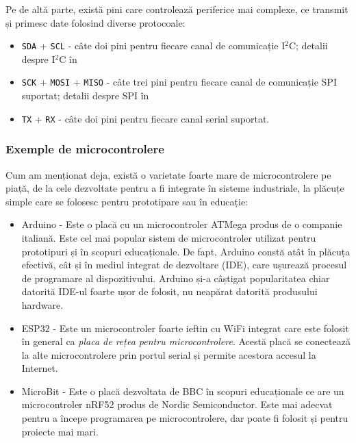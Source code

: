Pe de altă parte, există pini care controlează periferice mai complexe, ce
transmit și primesc date folosind diverse protocoale:

\begin{itemize}
  \item \texttt{SDA} + \texttt{SCL} - câte doi pini pentru fiecare canal de comunicație I$^2$C; detalii despre I$^2$C în 
  \item \texttt{SCK} + \texttt{MOSI} + \texttt{MISO} - câte trei pini pentru fiecare canal de
          comunicație SPI suportat; detalii despre SPI în 
  \item \texttt{TX} + \texttt{RX} - câte doi pini pentru fiecare canal serial suportat.
\end{itemize}

\subsubsection{Exemple de microcontrolere}
\label{sec:embed:micro-comp:micro:example}

Cum am menționat deja, există o varietate foarte mare de microcontrolere pe
piață, de la cele dezvoltate pentru a fi integrate în sisteme industriale, la
plăcuțe simple care se folosesc pentru prototipare sau în educație:

\begin{itemize}
  \item Arduino - Este o placă cu un microcontroler ATMega produs de o
    companie italiană. Este cel mai popular sistem de microcontroler
    utilizat pentru prototipuri și în scopuri educaționale. De fapt,
    Arduino constă atât în plăcuța efectivă, cât și în mediul
    integrat de dezvoltare (IDE), care ușurează procesul de
    programare al dispozitivului. Arduino și-a câștigat
    popularitatea chiar datorită IDE-ul foarte ușor de folosit, nu
    neapărat datorită produsului hardware.
  \item ESP32 - Este un microcontroler foarte ieftin cu WiFi integrat care este folosit
    în general ca \textit{placa de rețea pentru microcontrolere}. Acestă placă se conectează la
    alte microcontrolere prin portul serial și permite acestora accesul la Internet.
  \item MicroBit - Este o placă dezvoltata de BBC în scopuri educaționale ce are 
    un microcontroler nRF52 produs de Nordic Semiconductor. Este mai adecvat pentru
    a începe programarea pe microcontrolere, dar poate fi folosit și pentru
    proiecte mai mari.
\end{itemize}

